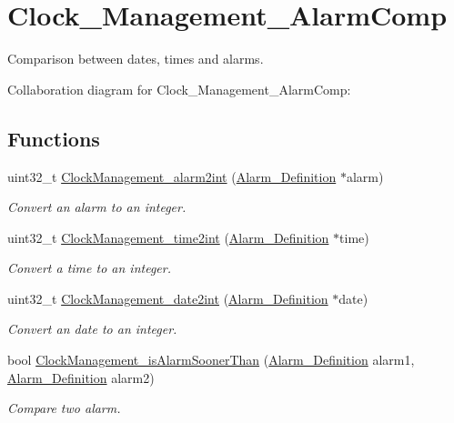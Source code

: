 \hypertarget{group___clock___management___alarm_comp}{}\section{Clock\+\_\+\+Management\+\_\+\+Alarm\+Comp}
\label{group___clock___management___alarm_comp}


Comparison between dates, times and alarms.  


Collaboration diagram for Clock\+\_\+\+Management\+\_\+\+Alarm\+Comp\+:
\subsection*{Functions}
\begin{DoxyCompactItemize}
\item 
uint32\+\_\+t \hyperlink{group___clock___management___alarm_comp_ga6e567ef31c1220b3440ca3f726f86d10}{Clock\+Management\+\_\+alarm2int} (\hyperlink{struct_alarm___definition}{Alarm\+\_\+\+Definition} $\ast$alarm)
\begin{DoxyCompactList}\small\item\em Convert an alarm to an integer. \end{DoxyCompactList}\item 
uint32\+\_\+t \hyperlink{group___clock___management___alarm_comp_ga36a1b1fbb98de2b2b73ccb40e87e4518}{Clock\+Management\+\_\+time2int} (\hyperlink{struct_alarm___definition}{Alarm\+\_\+\+Definition} $\ast$time)
\begin{DoxyCompactList}\small\item\em Convert a time to an integer. \end{DoxyCompactList}\item 
uint32\+\_\+t \hyperlink{group___clock___management___alarm_comp_ga9e3b465b980b97aa4477ac3574b5cfba}{Clock\+Management\+\_\+date2int} (\hyperlink{struct_alarm___definition}{Alarm\+\_\+\+Definition} $\ast$date)
\begin{DoxyCompactList}\small\item\em Convert an date to an integer. \end{DoxyCompactList}\item 
bool \hyperlink{group___clock___management___alarm_comp_ga20358c9f73302a285a8f084823e8eb2f}{Clock\+Management\+\_\+is\+Alarm\+Sooner\+Than} (\hyperlink{struct_alarm___definition}{Alarm\+\_\+\+Definition} alarm1, \hyperlink{struct_alarm___definition}{Alarm\+\_\+\+Definition} alarm2)
\begin{DoxyCompactList}\small\item\em Compare two alarm. \end{DoxyCompactList}\end{DoxyCompactItemize}


